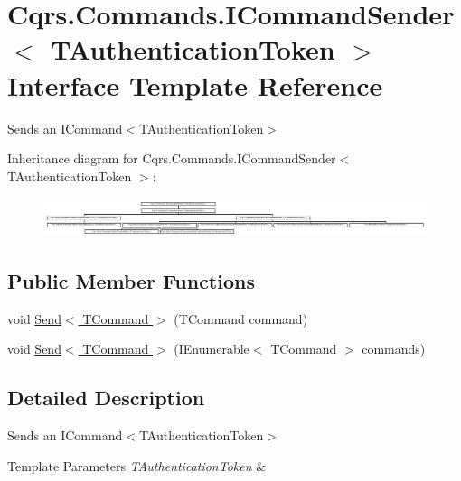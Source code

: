 \hypertarget{interfaceCqrs_1_1Commands_1_1ICommandSender}{}\section{Cqrs.\+Commands.\+I\+Command\+Sender$<$ T\+Authentication\+Token $>$ Interface Template Reference}
\label{interfaceCqrs_1_1Commands_1_1ICommandSender}


Sends an I\+Command$<$\+T\+Authentication\+Token$>$  


Inheritance diagram for Cqrs.\+Commands.\+I\+Command\+Sender$<$ T\+Authentication\+Token $>$\+:\begin{figure}[H]
\begin{center}
\leavevmode
\includegraphics[height=1.159420cm]{interfaceCqrs_1_1Commands_1_1ICommandSender}
\end{center}
\end{figure}
\subsection*{Public Member Functions}
\begin{DoxyCompactItemize}
\item 
void \hyperlink{interfaceCqrs_1_1Commands_1_1ICommandSender_a551d69f8679399fc0ce0fd99dead507a_a551d69f8679399fc0ce0fd99dead507a}{Send$<$ T\+Command $>$} (T\+Command command)
\item 
void \hyperlink{interfaceCqrs_1_1Commands_1_1ICommandSender_a3fb3ec40a3e862f721a7c9204e67e832_a3fb3ec40a3e862f721a7c9204e67e832}{Send$<$ T\+Command $>$} (I\+Enumerable$<$ T\+Command $>$ commands)
\end{DoxyCompactItemize}


\subsection{Detailed Description}
Sends an I\+Command$<$\+T\+Authentication\+Token$>$ 


\begin{DoxyTemplParams}{Template Parameters}
{\em T\+Authentication\+Token} & \\
\hline
\end{DoxyTemplParams}


